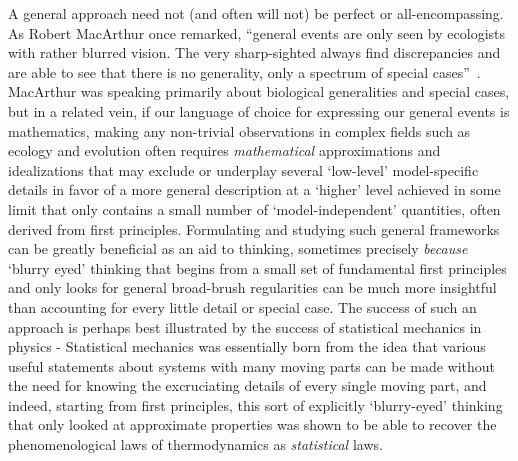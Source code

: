 A general approach need not (and often will not) be perfect or all-encompassing. As Robert MacArthur once remarked, ``general events are only seen by ecologists with rather blurred vision. The very sharp-sighted always find discrepancies and are able to see that there is no generality, only a spectrum of special cases”~\citep{kingsland_modeling_1985}. MacArthur was speaking primarily about biological generalities and special cases, but in a related vein, if our language of choice for expressing our general events is mathematics, making any non-trivial observations in complex fields such as ecology and evolution often requires \emph{mathematical} approximations and idealizations that may exclude or underplay several `low-level' model-specific details in favor of a more general description at a `higher' level achieved in some limit that only contains a small number of `model-independent' quantities, often derived from first principles. Formulating and studying such general frameworks can be greatly beneficial as an aid to thinking, sometimes precisely \emph{because} `blurry eyed' thinking that begins from a small set of fundamental first principles and only looks for general broad-brush regularities can be much more insightful than accounting for every little detail or special case. The success of such an approach is perhaps best illustrated by the success of statistical mechanics in physics - Statistical mechanics was essentially born from the idea that various useful statements about systems with many moving parts can be made without the need for knowing the excruciating details of every single moving part, and indeed, starting from first principles, this sort of explicitly `blurry-eyed' thinking that only looked at approximate properties was shown to be able to recover the phenomenological laws of thermodynamics as \emph{statistical} laws.

